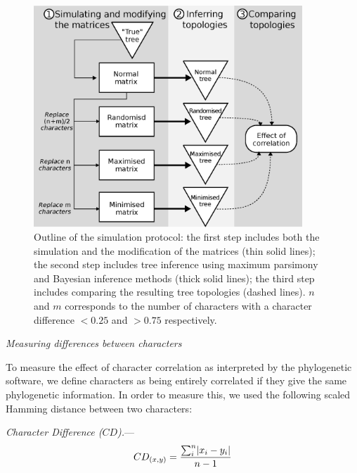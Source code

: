 \documentclass[12pt,letterpaper]{article}
\DeclarePairedDelimiter\abs{\lvert}{\rvert}%
\renewcommand{\subsection}[1]{%
\bigskip
\begin{center}
\begin{large}
\normalfont\itshape #1
\end{large}
\end{center}}
\renewcommand{\subsubsection}[1]{%
\vspace{2ex}
\noindent
\textit{#1.}---}
\begin{document}
\begin{figure}[!htbp]
\centering
   \includegraphics[width=0.9\textwidth]{outline.eps}
\caption{Outline of the simulation protocol: the first step includes both the simulation and the modification of the matrices (thin solid lines); the second step includes tree inference using maximum parsimony and Bayesian inference methods (thick solid lines); the third step includes comparing the resulting tree topologies (dashed lines). $n$ and $m$ corresponds to the number of characters with a character difference $<0.25$ and $>0.75$ respectively.}
\label{Fig:outline}
\end{figure}

\subsection{Measuring differences between characters}
\label{CDdescription}
To measure the effect of character correlation as interpreted by the phylogenetic software, we define characters as being entirely correlated if they give the same phylogenetic information.
In order to measure this, we used the following scaled Hamming distance between two characters:

\subsubsection{Character Difference ($CD$)}
\begin{equation}
    CD_{(x,y)} = \frac{\sum_{i}^{n}\abs{x_{i} - y_{i}}}{n-1}
\end{equation}
\end{document}
